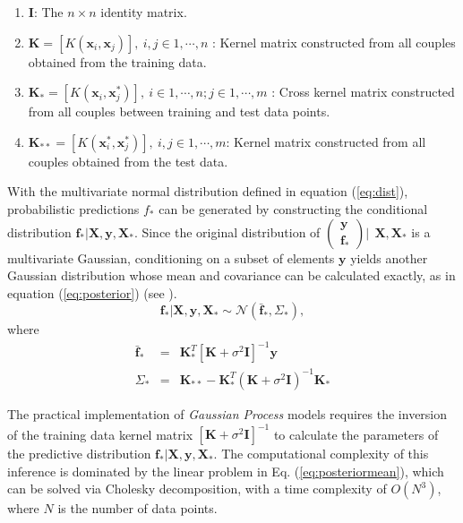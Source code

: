 \documentclass[referee,a4paper,12pt,traditabstract]{swsc}
\begin{document}
\begin{linenumbers}
\begin{enumerate}
      \item $\mathbf{I}$: The $n \times n$ identity matrix.
      \item $\mathbf{K} = [K(\mathbf{x}_i, \mathbf{x}_j)], \ i,j \in 1,\cdots,n$ : Kernel matrix constructed from all couples obtained from the training data.
      \item $\mathbf{K}_{*} = [K(\mathbf{x}_i, \mathbf{x}^{*}_j)], \ i \in 1,\cdots,n ; j \in 1,\cdots,m$ : Cross kernel matrix constructed from all couples between training and test data points.
      \item $\mathbf{K}_{**} = [K(\mathbf{x}^{*}_i, \mathbf{x}^{*}_j)], \ i,j \in 1,\cdots,m$: Kernel matrix constructed from all couples obtained from the test data.
\end{enumerate}

With the multivariate normal distribution defined in equation (\ref{eq:dist}), probabilistic predictions $f_*$ can be generated by constructing the conditional distribution $\mathbf{f_*}|\mathbf{X},\mathbf{y},\mathbf{X_*}$. Since the original distribution of $\left( \begin{array}{c} \mathbf{y} \\ \mathbf{f_*} \end{array} \right) | \ \ \mathbf{X}, \mathbf{X}_*$ is a multivariate Gaussian, conditioning on a subset of elements $\mathbf{y}$ yields another Gaussian distribution whose mean and covariance can be calculated exactly, as in equation (\ref{eq:posterior}) (see \citet{Rasmussen:2005:GPM:1162254}).
\begin{equation}
    \mathbf{f_*}|\mathbf{X},\mathbf{y},\mathbf{X_*} \sim \mathcal{N}(\mathbf{\bar{f}_*}, \Sigma_*)  \label{eq:posterior},
\end{equation}
where
\begin{eqnarray}
    \mathbf{\bar{f}_*} & = & \mathbf{K}^T_{*} [\mathbf{K} + \sigma^{2} \mathbf{I}]^{-1} \mathbf{y} \label{eq:posteriormean} \\
    \Sigma_* & = & \mathbf{K}_{**} - \mathbf{K}^T_{*} \left(\mathbf{K} + \sigma^{2} \mathbf{I}\right)^{-1} \mathbf{K}_{*} \label{eq:posteriorcov}
\end{eqnarray}

The practical implementation of \emph{Gaussian Process} models requires the inversion of the training data kernel matrix $[\mathbf{K} + \sigma^{2} \mathbf{I}]^{-1}$ to calculate the parameters of the predictive distribution $\mathbf{f_*}|\mathbf{X},\mathbf{y},\mathbf{X_*}$. The computational complexity of this inference is dominated by the linear problem in Eq. (\ref{eq:posteriormean}), which can be solved via Cholesky decomposition, with a time complexity of $O(N^3)$, where $N$ is the number of data points.


\end{linenumbers}
\end{document}
